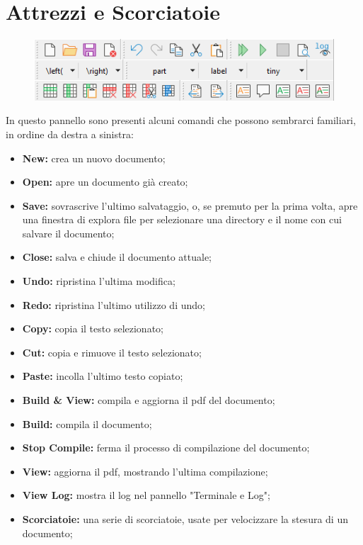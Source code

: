 \documentclass[12pt, oneside, openany, a4paper]{book}
\begin{document}
		\section{Attrezzi e Scorciatoie}
		\begin{figure}[h]
			\includegraphics[width=\textwidth]{Chap2/ShortcutPanel.png}
		\end{figure}
		\noindent In questo pannello sono presenti alcuni comandi che possono sembrarci familiari, in ordine da destra a sinistra:
		\begin{itemize}
			\item \textbf{New:} crea un nuovo documento;
			\item \textbf{Open:} apre un documento già creato;
			\item \textbf{Save:} sovrascrive l'ultimo salvataggio, o, se premuto per la prima volta, apre una finestra di explora file per selezionare una directory e il nome con cui salvare il documento;
			\item \textbf{Close:} salva e chiude il documento attuale;
			\item \textbf{Undo:} ripristina l'ultima modifica;
			\item \textbf{Redo:} ripristina l'ultimo utilizzo di undo;
			\item \textbf{Copy:} copia il testo selezionato;
			\item \textbf{Cut:} copia e rimuove il testo selezionato;
			\item \textbf{Paste:} incolla l'ultimo testo copiato;
			\item \textbf{Build \& View:} compila e aggiorna il pdf del documento;
			\item \textbf{Build:} compila il documento;
			\item \textbf{Stop Compile:} ferma il processo di compilazione del documento;
			\item \textbf{View:} aggiorna il pdf, mostrando l'ultima compilazione;
			\item \textbf{View Log:} mostra il log nel pannello "Terminale e Log";
			\item \textbf{Scorciatoie:} una serie di scorciatoie, usate per velocizzare la stesura di un documento;
		\end{itemize}		
\end{document}
